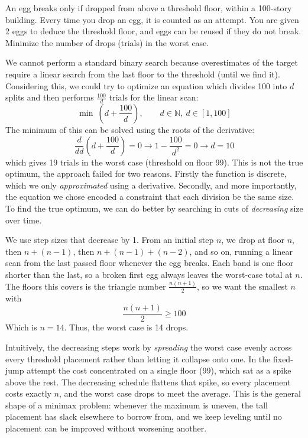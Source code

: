\begin{problem}
An egg breaks only if dropped from above a threshold floor, within a 100-story building. Every time you drop an egg, it is counted as an attempt. You are given 2 eggs to deduce the threshold floor, and eggs can be reused if they do not break. Minimize the number of drops (trials) in the worst case. 
\end{problem}

\begin{solution}
We cannot perform a standard binary search because overestimates of the target require a linear search from the last floor to the threshold (until we find it). Considering this, we could try to optimize an equation which divides 100 into $d$ splits and then performs $\frac{100}{d}$ trials for the linear scan:
\[
\min \  \left(d + \frac{100}{d}\right), \qquad d \in \mathbb{N}, \ d \in [1, 100]
\]
The minimum of this can be solved using the roots of the derivative:
\[
\frac{d}{dd} \left( d + \frac{100}{d} \right) = 0 \longrightarrow 1 - \frac{100}{d^2} = 0 \longrightarrow d = 10
\]
which gives 19 trials in the worst case (threshold on floor 99). This is not the true optimum, the approach failed for two reasons. Firstly the function is discrete, which we only \textit{approximated} using a derivative. Secondly, and more importantly, the equation we chose encoded a constraint that each division be the same size. To find the true optimum, we can do better by searching in cuts of \textit{decreasing} size over time.

We use step sizes that decrease by 1. From an initial step $n$, we drop at floor $n$, then $n + (n-1)$, then $n + (n-1) + (n-2)$, and so on, running a linear scan from the last passed floor whenever the egg breaks. Each band is one floor shorter than the last, so a broken first egg always leaves the worst-case total at $n$. The floors this covers is the triangle number $\frac{n(n+1)}{2}$, so we want the smallest $n$ with
\[
\frac{n(n+1)}{2} \geq 100
\]
Which is $n=14$. Thus, the worst case is 14 drops.

Intuitively, the decreasing steps work by \textit{spreading} the worst case evenly across every threshold placement rather than letting it collapse onto one. In the fixed-jump attempt the cost concentrated on a single floor (99), which sat as a spike above the rest. The decreasing schedule flattens that spike, so every placement costs exactly $n$, and the worst case drops to meet the average. This is the general shape of a minimax problem: whenever the maximum is uneven, the tall placement has slack elsewhere to borrow from, and we keep leveling until no placement can be improved without worsening another.
\end{solution}


